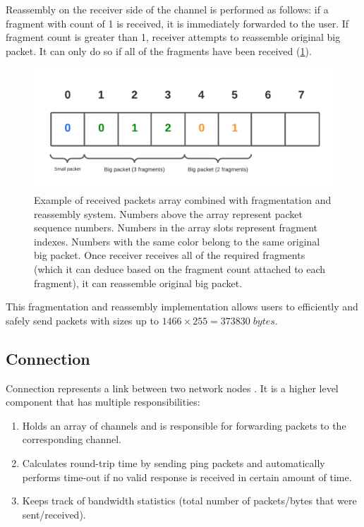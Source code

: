 \documentclass[times, utf8, diplomski]{fer}
\begin{document}
Reassembly on the receiver side of the channel is performed as follows: if a fragment with count of 1 is received, it is immediately forwarded to the user. If fragment count is greater than 1, receiver attempts to reassemble original big packet. It can only do so if all of the fragments have been received (\ref{fig:fragmentation-received-packets}).

\begin{figure}[H]
	\centering
	\includegraphics[scale=0.3]{Fragmentation-pending-packets}
	\caption{Example of received packets array combined with fragmentation and reassembly system. Numbers above the array represent packet sequence numbers. Numbers in the array slots represent fragment indexes. Numbers with the same color belong to the same original big packet. Once receiver receives all of the required fragments (which it can deduce based on the fragment count attached to each fragment), it can reassemble original big packet.}
	\label{fig:fragmentation-received-packets}
\end{figure}

This fragmentation and reassembly implementation allows users to efficiently and safely send packets with sizes up to $1466 \times 255 = 373830 \; bytes$.



\subsection{Connection}
Connection represents a link between two network nodes \cite{GafferOnGames:ClientServerConnection}. It is a higher level component that has multiple responsibilities:

\begin{enumerate}
	\item Holds an array of channels and is responsible for forwarding packets to the corresponding channel.
	\item Calculates round-trip time by sending ping packets and automatically performs time-out if no valid response is received in certain amount of time.
	\item Keeps track of bandwidth statistics (total number of packets/bytes that were sent/received).
\end{enumerate}
\end{document}
